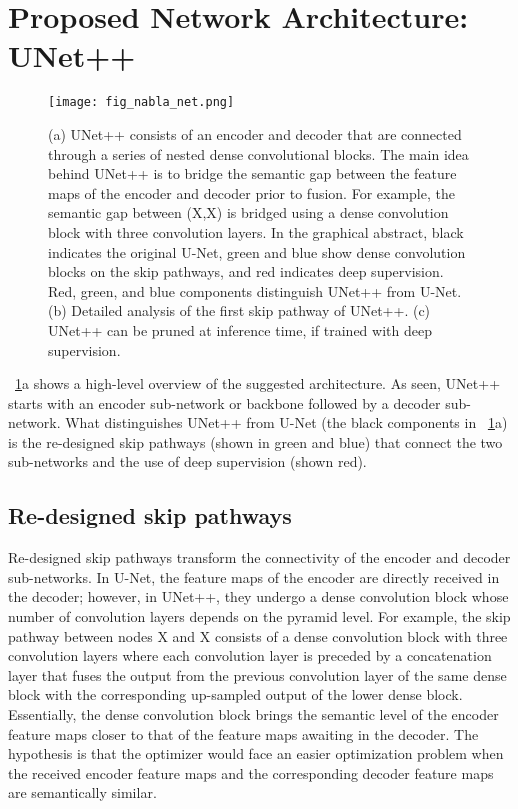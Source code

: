 \documentclass[runningheads]{llncs}
\begin{document}
\section{Proposed Network Architecture: UNet++}
\label{sec:methods}

\begin{figure}[t]
\begin{center}
\texttt{[image: fig\_nabla\_net.png]}
\end{center}
\caption{(a) UNet++ consists of an encoder and decoder that are connected through a series of nested dense convolutional blocks. The main idea behind UNet++ is to bridge the semantic gap between the feature maps of the encoder and decoder prior to fusion. For example, the semantic gap between (X,X) is bridged using a dense convolution block with three convolution layers. In the graphical abstract, black indicates the original U-Net, green and blue show dense convolution blocks on the skip pathways, and red indicates deep supervision. Red, green, and blue components distinguish  UNet++ from U-Net. (b) Detailed analysis of the first skip pathway of UNet++. (c) UNet++ can be pruned at inference time, if trained with deep supervision. }
\label{fig:network_architecture}
\end{figure}


\figurename~\ref{fig:network_architecture}a shows a high-level overview of the suggested architecture. As seen, UNet++ starts with an encoder sub-network or backbone followed by a decoder sub-network. What distinguishes UNet++ from U-Net (the black components in \figurename~\ref{fig:network_architecture}a) is the re-designed skip pathways (shown in green and blue) that connect the two sub-networks and the use of deep supervision (shown red).

\subsection{Re-designed skip pathways}
Re-designed skip pathways transform the connectivity of the encoder and decoder sub-networks. In U-Net, the feature maps of the encoder are directly received in the decoder; however, in  UNet++, they undergo a dense convolution block whose number of convolution layers depends on the pyramid level. For example, the skip pathway between nodes X and X consists of a dense convolution block with three convolution layers where each convolution layer is preceded by a concatenation layer that fuses the output from the previous convolution layer of the same dense block with the corresponding up-sampled output of the lower dense block. Essentially, the dense convolution block brings the semantic level of the encoder feature maps closer to that of the feature maps awaiting in the decoder. The hypothesis is that the optimizer would face an easier optimization problem when the received encoder feature maps and the corresponding decoder feature maps are semantically similar.
\end{document}
